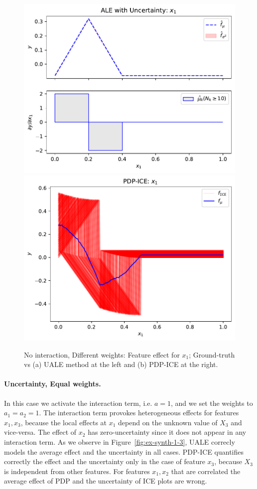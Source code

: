 \documentclass[twoside]{article}
\begin{document}
\begin{figure}[h]
  \centering
  \includegraphics[width=.23\textwidth]{example_2/dale_feat_0.pdf}
  \includegraphics[width=.23\textwidth]{example_2/pdp_ice_feat_0.pdf}
  \caption{No interaction, Different weights: Feature effect for \(x_1\);
    Ground-truth vs (a) UALE method at the left and (b) PDP-ICE at the
    right.}
  \label{fig:ex-synth-1-2}
\end{figure}

\paragraph{Uncertainty, Equal weights.}

In this case we activate the interaction term, i.e. \(a=1\), and we
set the weights to \(a_1=a_2=1\). The interaction term provokes
heterogeneous effects for features \(x_1, x_3\), because the local
effects at \(x_1\) depend on the unknown value of \(X_3\) and
vice-versa. The effect of \(x_2\) has zero-uncertainty since it does
not appear in any interaction term. As we observe in
Figure~\ref{fig:ex-synth-1-3}, UALE correcly models the average effect
and the uncertainty in all cases. PDP-ICE quantifies correctly the
effect and the uncertainty only in the case of feature \(x_3\),
because \(X_3\) is independent from other features. For features
\(x_1, x_2\) that are correlated the average effect of PDP
and the uncertainty of ICE plots are wrong.
\end{document}
